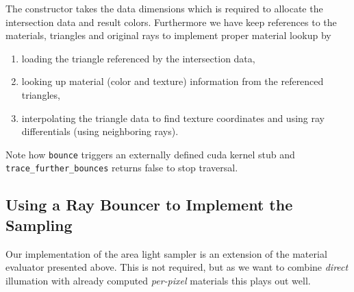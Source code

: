 \documentclass[a4paper,11pt]{scrartcl}
\begin{document}
The constructor takes the data dimensions which is required to allocate the intersection data and result colors.
Furthermore we have keep references to the materials, triangles and original rays to implement proper material lookup by
\begin{enumerate}
\item loading the triangle referenced by the intersection data,
\item looking up material (color and texture) information from the referenced triangles,
\item interpolating the triangle data to find texture coordinates and using ray differentials (using neighboring rays).
\end{enumerate}

Note how \lstinline|bounce| triggers an externally defined cuda kernel stub and \lstinline|trace_further_bounces| returns false to stop traversal.



\subsection{Using a Ray Bouncer to Implement the Sampling}
Our implementation of the area light sampler is an extension of the material evaluator presented above.
This is not required, but as we want to combine \emph{direct} illumation with already computed \emph{per-pixel} materials this plays out well.
\end{document}

